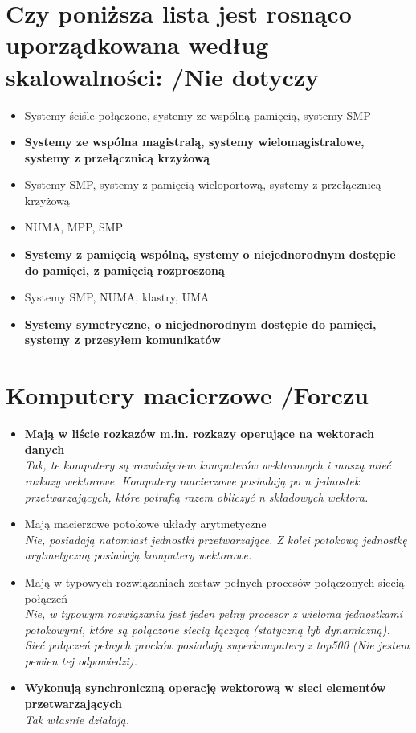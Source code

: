 \documentclass[a4paper,twoside]{article}
\begin{document}
\section{Czy poniższa lista jest rosnąco uporządkowana według skalowalności: {\small /Nie dotyczy}}
	\begin{itemize}
    \item Systemy ściśle połączone, systemy ze wspólną pamięcią, systemy SMP
    \item \textbf{Systemy ze wspólna magistralą, systemy wielomagistralowe, systemy z przełącznicą krzyżową}
    \item Systemy SMP, systemy z pamięcią wieloportową, systemy z przełącznicą krzyżową
    \item NUMA, MPP, SMP
    \item \textbf{Systemy z pamięcią wspólną, systemy o niejednorodnym dostępie do pamięci, z pamięcią rozproszoną}
    \item Systemy SMP, NUMA, klastry, UMA
    \item \textbf{Systemy symetryczne, o niejednorodnym dostępie do pamięci, systemy z przesyłem komunikatów}
    \end{itemize}
    
\section{Komputery macierzowe {\small /Forczu}}
	\begin{itemize}
    \item \textbf{Mają w liście rozkazów m.in. rozkazy operujące na wektorach danych}\\
    {\small \emph{Tak, te komputery są rozwinięciem komputerów wektorowych i muszą mieć rozkazy wektorowe. Komputery macierzowe posiadają po \emph{n} jednostek przetwarzających, które potrafią razem obliczyć \emph{n} składowych wektora.}}
    \item Mają macierzowe potokowe układy arytmetyczne\\
    {\small \emph{Nie, posiadają natomiast jednostki przetwarzające. Z kolei potokową jednostkę arytmetyczną posiadają komputery wektorowe.}}
    \item Mają w typowych rozwiązaniach zestaw pełnych procesów połączonych siecią połączeń\\
    {\small \emph{Nie, w typowym rozwiązaniu jest jeden pełny procesor z wieloma jednostkami potokowymi, które są połączone siecią łączącą (statyczną lyb dynamiczną). Sieć połączeń pełnych procków posiadają superkomputery z top500 (Nie jestem pewien tej odpowiedzi).}}
    \item \textbf{Wykonują synchroniczną operację wektorową w sieci elementów przetwarzających}\\
    {\small \emph{Tak własnie działają.}}
    \end{itemize}
    
\end{document}
